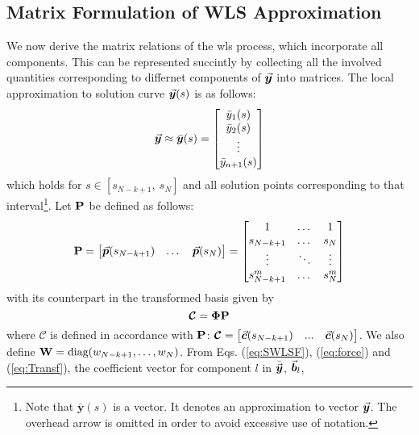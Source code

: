 \subsection{Matrix Formulation of WLS Approximation}\label{CH5-S2SS1}

We now
derive the matrix relations of the \acrshort{wls} process, which incorporate 
all 
components. This can be represented succintly by collecting all the involved 
quantities corresponding to differnet components of $\vec{\bm{y}}$ into matrices. 
The local approximation to solution curve $\vec{\bm{y}}(s)$ is as follows:
\begin{equation*}
	\vec{\bm{y}}\approx \bar{\bm{y}}(s)=\begin{bmatrix}
		\bar{y}_1(s)\\ \bar{y}_2(s)\\ \vdots \\ \bar{y}_{n+1}(s)
	\end{bmatrix}
\end{equation*}
which holds for $s\in[s_{N-k+1},\ s_N]$ and all solution points 
corresponding to that interval\footnote{Note that $\bar{\bm{y}}(s)$ is a 
vector. 
It denotes an approximation to vector $\vec{\bm{y}}$. The overhead arrow is omitted 
in order to avoid excessive use of notation.}. Let $\mathbf{P}$ be defined as 
follows:
\begin{equation}
	\mathbf{P}=\begin{bmatrix}
		\vec{\bm{p}}(s_{N-k+1}) & \dots & \vec{\bm{p}}(s_N)
	\end{bmatrix}=\begin{bmatrix}
		1 &  \dots & 1\\
		s_{N-k+1} & \dots & s_N\\
		\vdots & \ddots & \vdots\\
		s_{N-k+1}^m & \dots & s_N^m
	\end{bmatrix}
	\label{eq:P}
\end{equation}
with its counterpart  in the transformed basis given by
\begin{equation}
	\bm{\mathcal{C}}=\mathbf{\Phi}\mathbf{P}
	\label{eq:TransMat}
\end{equation}
where $\bm{\mathcal{C}}$ is defined in accordance with $\mathbf{P}$: 
$\bm{\mathcal{C}}= 
\begin{bmatrix}
	\vec{\bm{c}}(s_{N-k+1}) & ... & \vec{\bm{c}}(s_N)
\end{bmatrix}$. We also define $\mathbf{W}=\text{diag}(w_{N-k+1},\dots,w_N)$. From
Eqs. (\ref{eq:SWLSF}), (\ref{eq:force}) and (\ref{eq:Transf}), the coefficient 
vector
for component $l$ in $\bar{\vec{\bm{y}}}$, $\vec{\bm{b}}_l$, 
